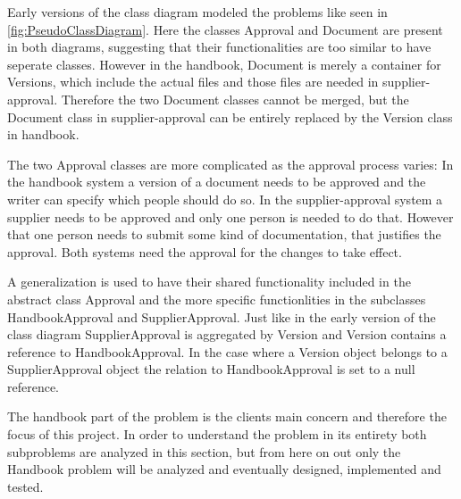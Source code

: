 Early versions of the class diagram modeled the problems like seen in \cref{fig:PseudoClassDiagram}.
Here the classes Approval and Document are present in both diagrams, suggesting that their functionalities are too similar to have seperate classes. However in the handbook, Document is merely a container for Versions, which include the actual files and those files are needed in supplier-approval. Therefore the two Document classes cannot be merged, but the Document class in supplier-approval can be entirely replaced by the Version class in handbook.

The two Approval classes are more complicated as the approval process varies:
In the handbook system a version of a document needs to be approved and the writer can specify which people should do so.
In the supplier-approval system a supplier needs to be approved and only one person is needed to do that.
However that one person needs to submit some kind of documentation, that justifies the approval.
Both systems need the approval for the changes to take effect.

A generalization is used to have their shared functionality included in the abstract class Approval and the more specific functionlities in the subclasses HandbookApproval and SupplierApproval.
Just like in the early version of the class diagram SupplierApproval is aggregated by Version and Version contains a reference to HandbookApproval.
In the case where a Version object belongs to a SupplierApproval object the relation to HandbookApproval is set to a null reference.

The handbook part of the problem is the clients main concern and therefore the focus of this project.
In order to understand the problem in its entirety both subproblems are analyzed in this section, but from here on out only the Handbook problem will be analyzed and eventually designed, implemented and tested.
